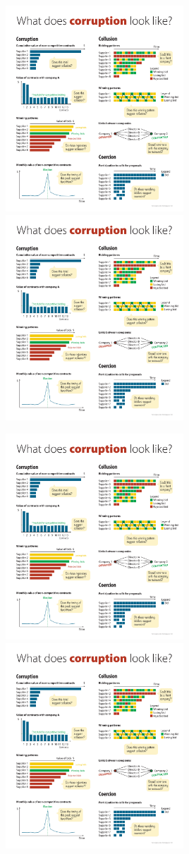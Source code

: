 \includegraphics[max width=0.5\textwidth]{../img/poster_value.pdf}
\includegraphics[max width=0.5\textwidth]{../img/poster_win_pattern.pdf}

\includegraphics[max width=0.5\textwidth]{../img/poster_bidding_patt.pdf}
\includegraphics[max width=0.5\textwidth]{../img/poster_cumulative_value.pdf}

